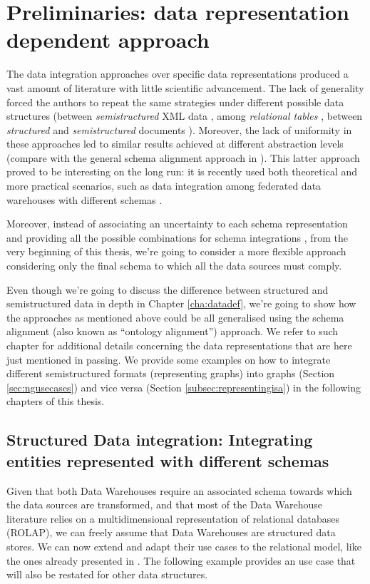 \section{Preliminaries: data representation dependent approach}\label{sec:oldschooldi}
The data integration approaches over specific data representations produced a vast amount of literature with little scientific advancement. The lack of generality forced the authors to repeat the same strategies under different possible data structures (between \textit{semistructured} XML data \cite{APoggi06}, among \textit{relational tables} \cite{Magnani09}, between \textit{structured} and \textit{semistructured}  documents \cite{ManolescuFK01,Lu2006,Magnani06}). Moreover, the lack of uniformity in these approaches led to similar results achieved at different abstraction levels (compare \cite{GolfarelliMPRT12} with the general schema alignment approach in \cite{euzenat2013d}). This latter approach proved to be interesting on the long run: it is recently used both theoretical \cite{VirgilioMT15} and more practical scenarios, such as data integration among federated data warehouses with different schemas  \cite{GolfarelliMPRT12}. 


Moreover, instead of associating an uncertainty to each schema representation and providing all the possible combinations for schema integrations \cite{Magnani09}, from the very beginning of this thesis, we’re going to consider a more flexible approach considering only the final schema to which all the data sources must comply. 

Even though we’re going to discuss the difference between structured and semistructured data in depth in Chapter \ref{cha:datadef}, we’re going to show how the approaches as mentioned above could be all generalised using the schema alignment (also known as ``ontology alignment'') approach. We refer to such chapter for additional details concerning the data representations that are here just mentioned in passing. We provide some examples on how to integrate different semistructured formats (representing graphs) into graphs (Section  \vref{sec:ngusecases}) and vice versa (Section \vref{subsec:representingisa}) in the following chapters of this thesis.








\subsection{Structured Data integration: Integrating entities represented with different schemas}\label{subsec:treunouno}
Given that both Data Warehouses require an associated schema towards which the data sources are transformed, and that most of the Data Warehouse literature relies on a multidimensional representation of relational databases (ROLAP), we can freely assume that Data Warehouses are structured data stores. We can now extend and adapt their use cases to the relational model, like the ones already presented in \cite{GolfarelliMPRT12}. The following example provides an use case that will also be restated for other data structures.


